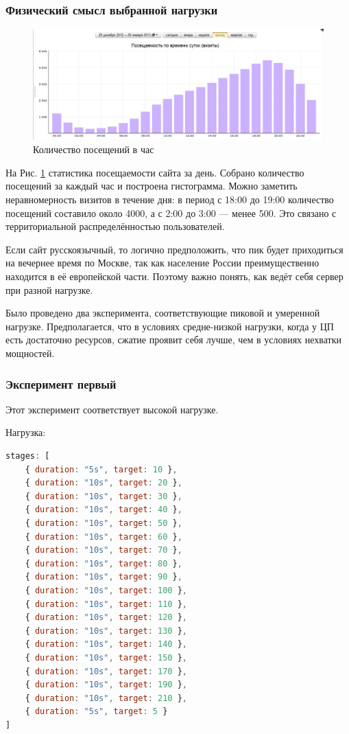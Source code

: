 \documentclass[12pt]{article}
\begin{document}
\subsubsection{Физический смысл выбранной нагрузки}

\begin{figure}[H]
    \centering
    \includegraphics[width=1\textwidth]{../images/pedsovet.png}
    \caption{Количество посещений в час \cite{pedsovet-forum}}
    \label{fig:num-of-visit-per-hour}
\end{figure}

На Рис. \ref{fig:num-of-visit-per-hour} статистика посещаемости сайта \cite{pedsovet-forum} за день. Собрано количество посещений за каждый час и построена гистограмма.
Можно заметить неравномерность визитов в течение дня: в период с 18:00 до 19:00 количество посещений составило около 4000,
а с 2:00 до 3:00 — менее 500. Это связано с территориальной распределённостью пользователей.

Если сайт русскоязычный, то логично предположить, что пик будет приходиться на вечернее время по Москве,
так как население России преимущественно находится в её европейской части. Поэтому важно понять, как ведёт себя сервер при разной нагрузке.

Было проведено два эксперимента, соответствующие пиковой и умеренной нагрузке.
Предполагается, что в условиях средне-низкой нагрузки, когда у ЦП есть достаточно ресурсов, сжатие проявит себя лучше, чем в условиях нехватки мощностей.

\subsubsection{Эксперимент первый}

Этот эксперимент соответствует высокой нагрузке.

Нагрузка:
\begin{lstlisting}[language=JavaScript]
stages: [
    { duration: "5s", target: 10 },
    { duration: "10s", target: 20 },
    { duration: "10s", target: 30 },
    { duration: "10s", target: 40 },
    { duration: "10s", target: 50 },
    { duration: "10s", target: 60 },
    { duration: "10s", target: 70 },
    { duration: "10s", target: 80 },
    { duration: "10s", target: 90 },
    { duration: "10s", target: 100 },
    { duration: "10s", target: 110 },
    { duration: "10s", target: 120 },
    { duration: "10s", target: 130 },
    { duration: "10s", target: 140 },
    { duration: "10s", target: 150 },
    { duration: "10s", target: 170 },
    { duration: "10s", target: 190 },
    { duration: "10s", target: 210 },
    { duration: "5s", target: 5 }
]
\end{lstlisting}
\end{document}
